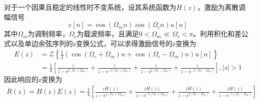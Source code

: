 \begin{example}
    对于一个因果且稳定的线性时不变系统，设其系统函数为$H(z)$，激励为离散调幅信号
    $$e[n]=\cos(\Omega_m n)\cos(\Omega_c n)u[n]$$
    其中$\Omega_m$为调制频率，$\Omega_c$为载波频率，且满足$0<\Omega_m\ll\Omega_c<\pi$。利用积化和差公式以及单边余弦序列的z变换公式，可以求得激励信号的z变换为
    \begin{align*}
        E(z)&=\mathcal{Z}\left\{\frac{1}{2}\left(\cos(\Omega_c+\Omega_m)n+\cos(\Omega_c-\Omega_m)n\right)u[n]\right\}\\
        &=\frac{1}{4}\left[\frac{z}{z-\mathrm{e}^{\mathrm{i}(\Omega_c+\Omega_m)}}+\frac{z}{z-\mathrm{e}^{-\mathrm{i}(\Omega_c+\Omega_m)}}+\frac{z}{z-\mathrm{e}^{\mathrm{i}(\Omega_c-\Omega_m)}}+\frac{z}{z-\mathrm{e}^{-\mathrm{i}(\Omega_c-\Omega_m)}}\right],|z|>1
    \end{align*}
    因此响应的z变换为
    \begin{align*}
        R(z)=H(z)E(z)=\frac{1}{4}\left[\frac{zH(z)}{z-\mathrm{e}^{\mathrm{i}(\Omega_c+\Omega_m)}}+\frac{zH(z)}{z-\mathrm{e}^{-\mathrm{i}(\Omega_c+\Omega_m)}}+\frac{zH(z)}{z-\mathrm{e}^{\mathrm{i}(\Omega_c-\Omega_m)}}+\frac{zH(z)}{z-\mathrm{e}^{-\mathrm{i}(\Omega_c-\Omega_m)}}\right]
    \end{align*}


\end{example}
